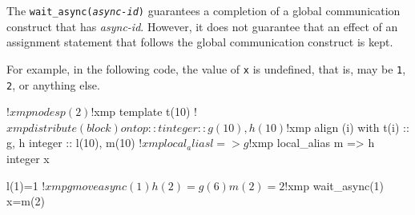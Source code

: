 The \texttt{wait\_async(\textit{async-id})} guarantees a completion of
a global communication construct that has \textit{async-id}.  However,
it does not guarantee that an effect of an assignment statement that
follows the global communication construct is kept.

For example, in the following code, the value of \texttt{x} is
undefined, that is, may be \texttt{1}, \texttt{2}, or anything else.
\begin{center}
\begin{XFexample}
!$xmp nodes p(2)
!$xmp template t(10)
!$xmp distribute (block) onto p :: t
      integer :: g(10), h(10)
!$xmp align (i) with t(i) :: g, h
      integer :: l(10), m(10)
!$xmp local_alias l => g
!$xmp local_alias m => h
      integer x

      l(1)=1
!$xmp gmove async(1)
      h(2)=g(6)
      m(2)=2
!$xmp wait_async(1)
      x=m(2)
\end{XFexample}
\end{center}



%


